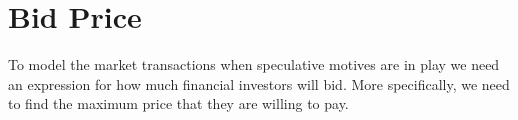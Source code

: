 






\section{Bid Price}
To model the market transactions when speculative motives are in play we need an expression for how much financial investors will bid. More specifically, we need to find the maximum price that they are willing to pay. 


